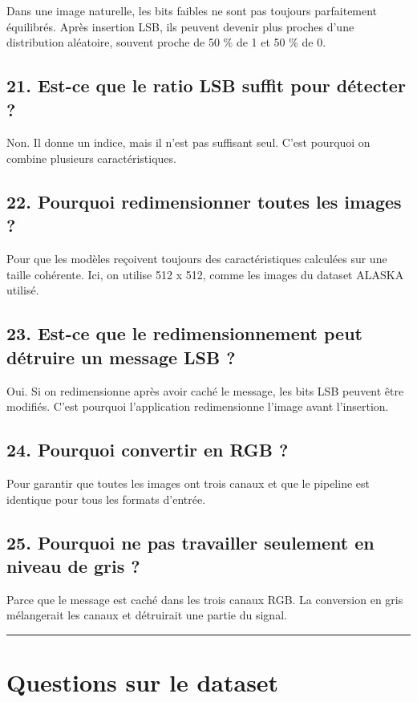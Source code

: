 \documentclass[11pt,a4paper]{article}
\begin{document}
Dans une image naturelle, les bits faibles ne sont pas toujours parfaitement équilibrés. Après insertion LSB, ils peuvent devenir plus proches d'une distribution aléatoire, souvent proche de 50 \% de 1 et 50 \% de 0.

\subsection{21. Est-ce que le ratio LSB suffit pour détecter ?}

Non. Il donne un indice, mais il n'est pas suffisant seul. C'est pourquoi on combine plusieurs caractéristiques.

\subsection{22. Pourquoi redimensionner toutes les images ?}

Pour que les modèles reçoivent toujours des caractéristiques calculées sur une taille cohérente. Ici, on utilise 512 x 512, comme les images du dataset ALASKA utilisé.

\subsection{23. Est-ce que le redimensionnement peut détruire un message LSB ?}

Oui. Si on redimensionne après avoir caché le message, les bits LSB peuvent être modifiés. C'est pourquoi l'application redimensionne l'image avant l'insertion.

\subsection{24. Pourquoi convertir en RGB ?}

Pour garantir que toutes les images ont trois canaux et que le pipeline est identique pour tous les formats d'entrée.

\subsection{25. Pourquoi ne pas travailler seulement en niveau de gris ?}

Parce que le message est caché dans les trois canaux RGB. La conversion en gris mélangerait les canaux et détruirait une partie du signal.

\hrule

\section{Questions sur le dataset}
\end{document}
